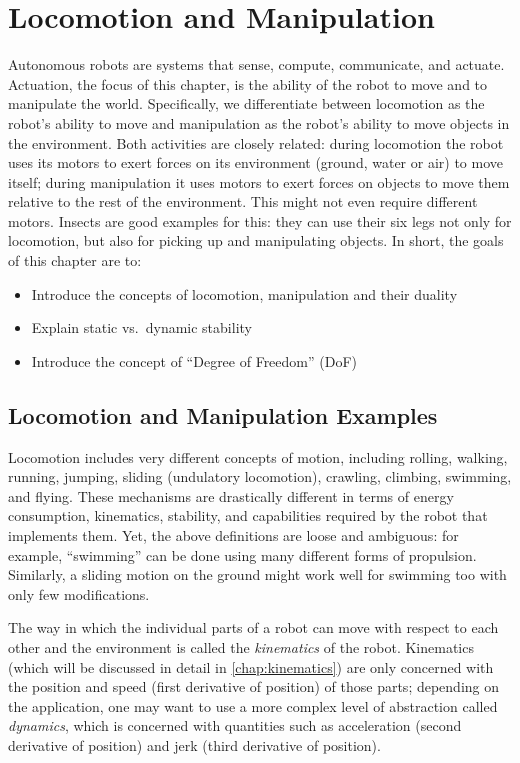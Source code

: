 \chapter{Locomotion and Manipulation}\label{chap:locomotion}

Autonomous robots are systems that sense, compute, communicate, and actuate. Actuation, the focus of this chapter, is the ability of the robot to move and to manipulate the world. Specifically, we differentiate between locomotion as the robot's ability to move and manipulation as the robot's ability to move objects in the environment. Both activities are closely related: during locomotion the robot uses its motors to exert forces on its environment (ground, water or air) to move itself; during manipulation it uses motors to exert forces on objects to move them relative to the rest of the environment. This might not even require different motors. Insects are good examples for this: they can use their six legs not only for locomotion, but also for picking up and manipulating objects. In short, the goals of this chapter are to:
\begin{itemize}
\item Introduce the concepts of locomotion, manipulation and their duality
\item Explain static vs.\ dynamic stability
\item Introduce the concept of ``Degree of Freedom'' (DoF)
\end{itemize}

\section{Locomotion and Manipulation Examples}

Locomotion includes very different concepts of motion, including rolling, walking, running, jumping, sliding (undulatory locomotion), crawling, climbing, swimming, and flying. These mechanisms are drastically different in terms of energy consumption, kinematics, stability, and capabilities required by the robot that implements them. Yet, the above definitions are loose and ambiguous: for example, ``swimming'' can be done using many different forms of propulsion. Similarly, a sliding motion on the ground might work well for swimming too with only few modifications.

The way in which the individual parts of a robot can move with respect to each other and the environment is called the \textsl{kinematics} of the robot. Kinematics (which will be discussed in detail in \cref{chap:kinematics}) are only concerned with the position and speed (first derivative of position) of those parts; depending on the application, one may want to use a more complex level of abstraction called \textsl{dynamics}, which is concerned with quantities such as acceleration (second derivative of position) and jerk (third derivative of position).

